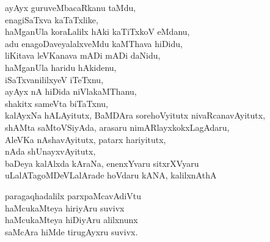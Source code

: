 \begin{entry}
\begin{shl}
ayAyx guruveMbacaRkanu taMdu,\\
enagiSaTxva kaTaTxlike,\\
haMganUla koraLalilx hAki kaTiTxkoV eMdanu,\\
adu enagoDaveyalalxveMdu kaMThava hiDidu,\\
liKitava leVKanava mADi mADi daNidu,\\
haMganUla haridu hAkidenu,\\
iSaTxvanililxyeV iTeTxnu,\\
ayAyx nA hiDida niVlakaMThanu,\\
shakitx sameVta biTaTxnu,\\
kalAyxNa hALAyitutx, BaMDAra sorehoVyitutx nivaRcanavAyitutx,\\
shAMta saMtoVSiyAda, arasaru nimARlayxkokxLagAdaru,\\
AleVKa nAshavAyitutx, patarx hariyitutx,\\
nAda shUnayxvAyitutx,\\
baDeya kalAlxda kAraNa, enenxYvaru sitxrXVyaru\\
uLalATagoMDeVLalArade hoVdaru kANA, kalilxnAthA
\end{shl}
\end{entry}

\begin{entry}
\begin{shl}
paragaqhadalilx parxpaMcavAdiVtu\\
haMcukaMteya hiriyAru suvivx\\
haMcukaMteya hiDiyAru alilxnunx\\
saMcAra hiMde tirugAyxru suvivx.
\end{shl}
\end{entry}

